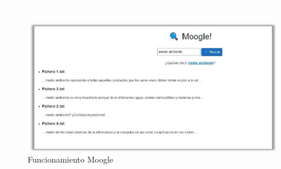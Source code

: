 \documentclass[10pt,a4paper]{article}
\begin{document}
\newpage
\textcolor{White}{\colorbox{NavyBlue}{EJEMPLO DE EJECUCIÓN DE LA APLICACIÓN}}

\begin{figure}[h]
	\centering
	\includegraphics{mooglePaint.png}
	\caption{Funcionamiento Moogle}
\end{figure}
\end{document}
